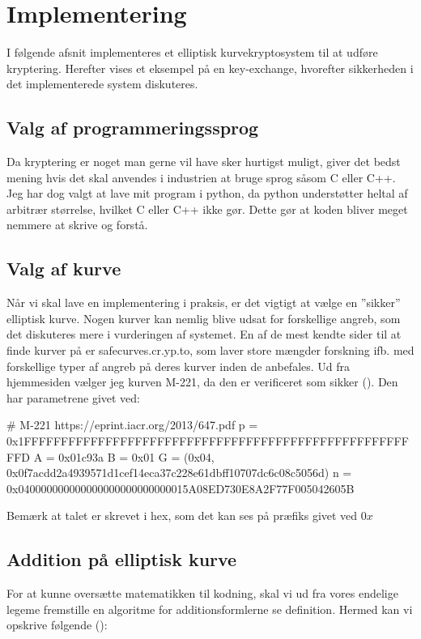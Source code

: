 \section{Implementering}
I følgende afsnit implementeres et elliptisk kurvekryptosystem til at udføre kryptering. Herefter vises et eksempel på en key-exchange, hvorefter sikkerheden i det implementerede system diskuteres.

\subsection{Valg af programmeringssprog}
Da kryptering er noget man gerne vil have sker hurtigst muligt, giver det bedst mening hvis det skal anvendes i industrien at bruge sprog såsom C eller C++. Jeg har dog valgt at lave mit program i python, da python understøtter heltal af arbitrær størrelse, hvilket C eller C++ ikke gør. Dette gør at koden bliver meget nemmere at skrive og forstå. 

\subsection{Valg af kurve}
Når vi skal lave en implementering i praksis, er det vigtigt at vælge en ”sikker” elliptisk kurve. Nogen kurver kan nemlig blive udsat for forskellige angreb, som det diskuteres mere i vurderingen af systemet. En af de mest kendte sider til at finde kurver på er safecurves.cr.yp.to, som laver store mængder forskning ifb. med forskellige typer af angreb på deres kurver inden de anbefales. Ud fra hjemmesiden vælger jeg kurven M-221, da den er verificeret som sikker (\cite{danielj.bernsteintanjalange2014}). Den har parametrene givet ved:
\begin{python}
# M-221 https://eprint.iacr.org/2013/647.pdf
p = 0x1FFFFFFFFFFFFFFFFFFFFFFFFFFFFFFFFFFFFFFFFFFFFFFFFFFFFFFD
A = 0x01c93a
B = 0x01
G = (0x04, 0x0f7acdd2a4939571d1cef14eca37c228e61dbff10707dc6c08c5056d)
n = 0x040000000000000000000000000015A08ED730E8A2F77F005042605B
\end{python}
Bemærk at talet er skrevet i hex, som det kan ses på præfiks givet ved $0x$

\subsection{Addition på elliptisk kurve}
For at kunne oversætte matematikken til kodning, skal vi ud fra vores endelige legeme fremstille en algoritme for additionsformlerne se definition. Hermed kan vi opskrive følgende (\cite{williamstein2006}):

